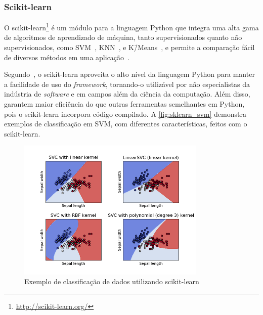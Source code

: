 \subsubsection{Scikit-learn}\label{sec:ml_sklearn}

O scikit-learn\footnote{\url{http://scikit-learn.org/}} é um módulo para a linguagem Python que integra uma alta gama de algoritmos de aprendizado de máquina, tanto supervisionados quanto não supervisionados, como SVM~\cite{cortes:1995svm}, KNN~\cite{cover:1967knn}, e K\=/Means~\cite{macqueen:1967kmeans}, e permite a comparação fácil de diversos métodos em uma aplicação~\cite{pedregosa:2011}.

Segundo~, o scikit-learn aproveita o alto nível da linguagem Python para manter a facilidade de uso do \textit{framework}, tornando-o utilizável por não especialistas da indústria de \textit{software} e em campos além da ciência da computação. Além disso,~ garantem maior eficiência do que outras ferramentas semelhantes em Python, pois o scikit-learn incorpora código compilado. A \autoref{fig:sklearn_svm} demonstra exemplos de classificação em SVM, com diferentes características, feitos com o scikit-learn.

\begin{figure}[ht]
	\caption{\label{fig:sklearn_svm}Exemplo de classificação de dados utilizando scikit-learn}
	\begin{center}
	    \includegraphics[width=0.8\textwidth]{resources/sklearn_iris_svm.png}
	\end{center}
\end{figure}

